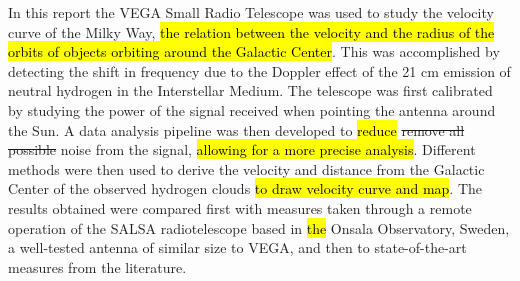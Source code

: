 In this report the VEGA Small Radio Telescope was used to study the velocity curve of the Milky Way, \hl{the relation between the velocity and the radius of the orbits of objects orbiting around the Galactic Center}.
This was accomplished by detecting the shift in frequency due to the Doppler effect of the 21 cm emission of neutral hydrogen in the Interstellar Medium.
The telescope was first calibrated by studying the power of the signal received when pointing the antenna around the Sun.
A data analysis pipeline was then developed to \hl{reduce} \st{remove all possible} noise from the signal, \hl{allowing for a more precise analysis}.
Different methods were then used to derive the velocity and distance from the Galactic Center of the observed hydrogen clouds \hl{to draw velocity curve and map}.
The results obtained were compared first with measures taken through a remote operation of the SALSA radiotelescope based in \hl{the} Onsala Observatory, Sweden, a well-tested antenna of similar size to VEGA, and then to state-of-the-art measures from the literature.


